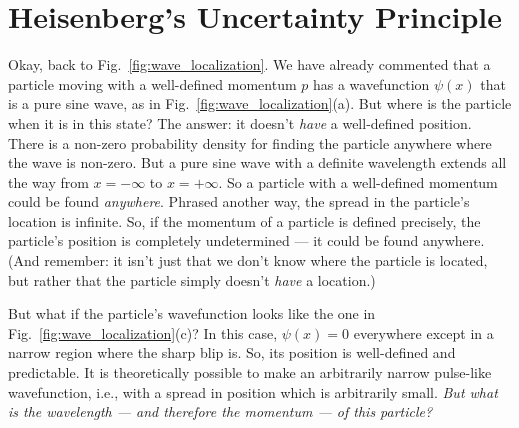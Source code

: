 \section{Heisenberg's Uncertainty Principle}

Okay, back to Fig.~\ref{fig:wave_localization}. We have already
commented that a particle moving with a well-defined momentum
$p$ has a wavefunction $\psi(x)$ that is a pure sine wave, as in
Fig.~\ref{fig:wave_localization}(a).  But where is the particle when
it is in this state? The answer: it doesn't {\it have} a well-defined
position.  There is a non-zero probability density for finding the
particle anywhere where the wave is non-zero. But a pure sine wave with
a definite wavelength extends all the way from $x = -\infty$ to $x =
+\infty$. So a particle with a well-defined momentum could be found {\it
anywhere}. Phrased another way, the spread in the particle's location
is infinite.  So, if the momentum of a particle is defined precisely,
the particle's position is completely undetermined --- it could be found
anywhere. (And remember: it isn't just that we don't know where the
particle is located, but rather that the particle simply doesn't {\it
have} a location.)

But what if the particle's wavefunction looks like the one in
Fig.~\ref{fig:wave_localization}(c)? In this case, $\psi(x) = 0$
everywhere except in a narrow region where the sharp blip is. So, its
position is well-defined and predictable. It is theoretically possible to
make an arbitrarily narrow pulse-like wavefunction, i.e., with a spread
in position which is arbitrarily small.  {\it But what is the wavelength
--- and therefore the momentum --- of this particle?}

